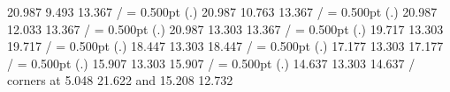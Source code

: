 { 20.987  9.493 13.367 /
%
%
\linethickness= 0.500pt
\setplotsymbol ({\thinlinefont .})
 20.987 10.763 13.367 /
%
%
\linethickness= 0.500pt
\setplotsymbol ({\thinlinefont .})
 20.987 12.033 13.367 /
%
%
\linethickness= 0.500pt
\setplotsymbol ({\thinlinefont .})
 20.987 13.303 13.367 /
%
%
\linethickness= 0.500pt
\setplotsymbol ({\thinlinefont .})
 19.717 13.303 19.717 /
%
%
\linethickness= 0.500pt
\setplotsymbol ({\thinlinefont .})
 18.447 13.303 18.447 /
%
%
\linethickness= 0.500pt
\setplotsymbol ({\thinlinefont .})
 17.177 13.303 17.177 /
%
%
\linethickness= 0.500pt
\setplotsymbol ({\thinlinefont .})
 15.907 13.303 15.907 /
%
%
\linethickness= 0.500pt
\setplotsymbol ({\thinlinefont .})
 14.637 13.303 14.637 /
\linethickness=0pt
\putrectangle corners at  5.048 21.622 and 15.208 12.732
\endpicture}
